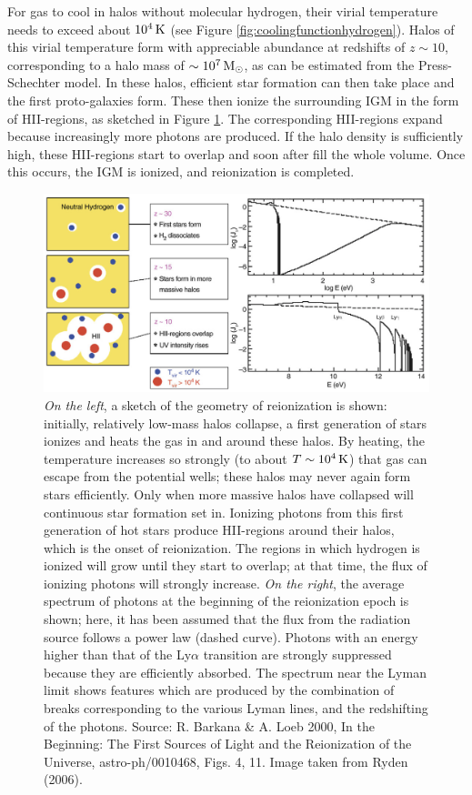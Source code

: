 \documentclass[a4paper,11pt]{article}
\begin{document}
{\noindent}For gas to cool in halos without molecular hydrogen, their virial temperature needs to exceed about $10^4\,{\rm K}$ (see Figure \ref{fig:coolingfunctionhydrogen}). Halos of this virial temperature form with appreciable abundance at redshifts of $z\sim10$, corresponding to a halo mass of $\sim10^7\,{\rm M_\odot}$, as can be estimated from the Press-Schechter model. In these halos, efficient star formation can then take place and the first proto-galaxies form. These then ionize the surrounding IGM in the form of HII-regions, as sketched in Figure \ref{fig:reionization}. The corresponding HII-regions expand because increasingly more photons are produced. If the halo density is sufficiently high, these HII-regions start to overlap and soon after fill the whole volume. Once this occurs, the IGM is ionized, and reionization is completed.

\begin{figure}[t]
    \includegraphics[width=16cm]{figures/reionization.png}
    \centering
    \caption{\footnotesize{\textit{On the left}, a sketch of the geometry of reionization is shown: initially, relatively low-mass halos collapse, a first generation of stars ionizes and heats the gas in and around these halos. By heating, the temperature increases so strongly (to about $T\sim10^4\,{\rm K}$) that gas can escape from the potential wells; these halos may never again form stars efficiently. Only when more massive halos have collapsed will continuous star formation set in. Ionizing photons from this first generation of hot stars produce HII-regions around their halos, which is the onset of reionization. The regions in which hydrogen is ionized will grow until they start to overlap; at that time, the flux of ionizing photons will strongly increase. \textit{On the right}, the average spectrum of photons at the beginning of the reionization epoch is shown; here, it has been assumed that the flux from the radiation source follows a power law (dashed curve). Photons with an energy higher than that of the Ly$\alpha$ transition are strongly suppressed because they are efficiently absorbed. The spectrum near the Lyman limit shows features which are produced by the combination of breaks corresponding to the various Lyman lines, and the redshifting of the photons. Source: R. Barkana \& A. Loeb 2000, In the Beginning: The First Sources of Light and the Reionization of the Universe, astro-ph/0010468, Figs. 4, 11. Image taken from Ryden (2006).}}
    \label{fig:reionization}
\end{figure}
\end{document}
